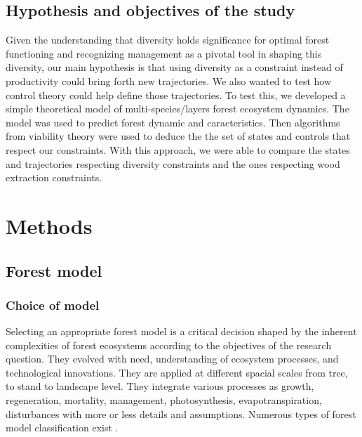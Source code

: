 \documentclass{article}
\begin{document}
\subsection{Hypothesis and objectives of the study}

Given the understanding that diversity holds significance for optimal forest functioning and recognizing management as a pivotal tool in shaping this diversity, our main hypothesis is that using diversity as a constraint instead of productivity could bring forth new trajectories. We also wanted to test how control theory could help define those trajectories. To test this, we developed a simple theoretical model of multi-species/layers forest ecosystem dynamics. The model was used to predict forest dynamic and caracteristics. Then algorithms from viability theory were used to deduce the the set of states and controls that respect our constraints. With this approach, we were able to compare the states and trajectories respecting diversity constraints and the ones respecting wood extraction constraints.

\section{Methods}

\subsection{Forest model}
 
\subsubsection{Choice of model}

Selecting an appropriate forest model is a critical decision shaped by the inherent complexities of forest ecosystems according to the objectives of the research question. They evolved with need, understanding of ecosystem processes, and technological innovations. They are applied at different spacial scales from tree, to stand to landscape level. They integrate various processes as growth, regeneration, mortality, management, photosynthesis, evapotranspiration, disturbances with more or less details and assumptions. Numerous types of forest model classification exist \autocite{porteModellingMixedForest2002}. 
\end{document}
